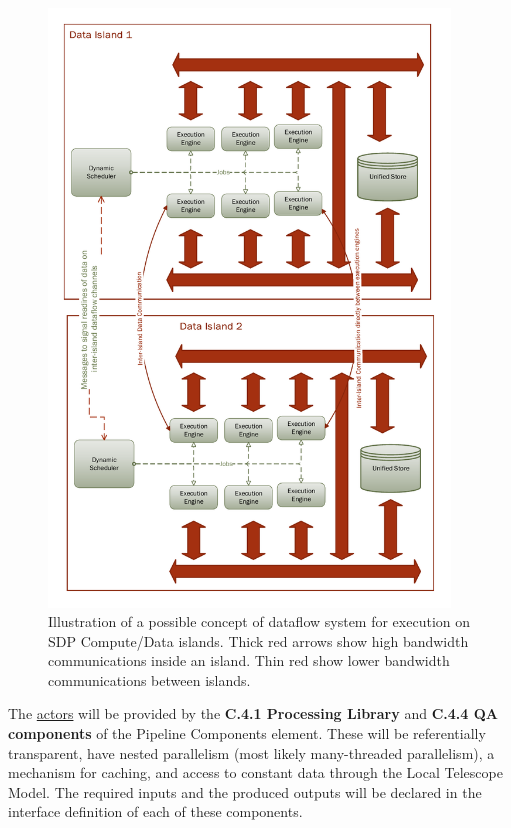 \documentclass[11pt,a4paper]{article}
\begin{document}
\begin{figure}
  \begin{centering}

  \includegraphics[width=0.95\textwidth,trim=0 0cm 0 0]{figs/dataflow/Architecture-ExecutionConcept}

\end{centering}
\caption{Illustration of a possible concept of dataflow system for
    execution on SDP Compute/Data islands. Thick red arrows show high
    bandwidth communications inside an island. Thin red show lower
    bandwidth communications between islands.}
  \label{fig:dataislandexecmodel}
\end{figure}

The \underline{actors} will be provided by the {\bf C.4.1 Processing
  Library} and {\bf C.4.4 QA components} of the Pipeline Components
element. These will be referentially transparent, have nested
parallelism (most likely many-threaded parallelism), a mechanism for
caching, and access to constant data through the Local Telescope
Model. The required inputs and the produced outputs will be declared
in the interface definition of each of these components.
\end{document}
